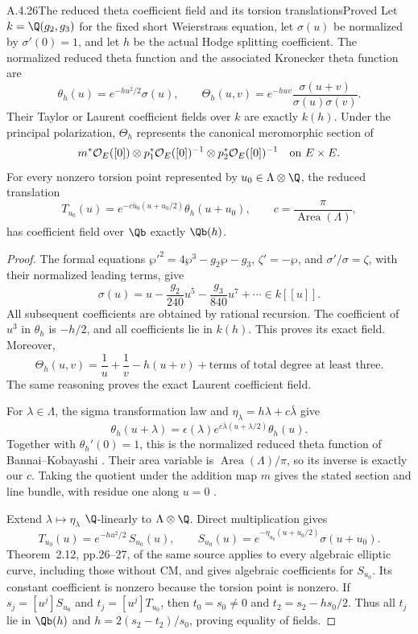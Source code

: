 \begin{result}{A.4.26}{The reduced theta coefficient field and its torsion translations}{Proved}
Let $k=\Q(g_2,g_3)$ for the fixed short Weierstrass equation, let $\sigma(u)$ be normalized by $\sigma'(0)=1$, and let $h$ be the actual Hodge splitting coefficient. The normalized reduced theta function and the associated Kronecker theta function are
\[
 \theta_h(u)=e^{-hu^2/2}\sigma(u),\qquad
 \Theta_h(u,v)=e^{-huv}\frac{\sigma(u+v)}{\sigma(u)\sigma(v)}.
\]
Their Taylor or Laurent coefficient fields over $k$ are exactly $k(h)$. Under the principal polarization, $\Theta_h$ represents the canonical meromorphic section of
\[
 m^*\mathcal O_E([0])\otimes
 p_1^*\mathcal O_E([0])^{-1}\otimes
 p_2^*\mathcal O_E([0])^{-1}
 \quad\hbox{on }E\times E.
\]
For every nonzero torsion point represented by $u_0\in\Lambda\otimes\Q$, the reduced translation
\[
 T_{u_0}(u)=
 e^{-c\bar u_0(u+u_0/2)}\theta_h(u+u_0),
 \qquad c=\frac{\pi}{\operatorname{Area}(\Lambda)},
\]
has coefficient field over $\Qb$ exactly $\Qb(h)$.
\end{result}
\begin{proof}
The formal equations $\wp'^2=4\wp^3-g_2\wp-g_3$, $\zeta'=-\wp$, and $\sigma'/\sigma=\zeta$, with their normalized leading terms, give
\[
 \sigma(u)=u-\frac{g_2}{240}u^5-\frac{g_3}{840}u^7+\cdots\in k[[u]].
\]
All subsequent coefficients are obtained by rational recursion. The coefficient of $u^3$ in $\theta_h$ is $-h/2$, and all coefficients lie in $k(h)$. This proves its exact field. Moreover,
\[
 \Theta_h(u,v)=\frac1u+\frac1v-h(u+v)
       +\text{terms of total degree at least three}.
\]
The same reasoning proves the exact Laurent coefficient field.

For $\lambda\in\Lambda$, the sigma transformation law and
$\eta_\lambda=h\lambda+c\bar\lambda$ give
\[
 \theta_h(u+\lambda)
 =\epsilon(\lambda)
   e^{c\bar\lambda(u+\lambda/2)}\theta_h(u).
\]
Together with $\theta_h'(0)=1$, this is the normalized reduced theta function of Bannai--Kobayashi \cite[Example 1.9, pp.10--11]{EllBannaiKobayashi2010}. Their area variable is $\operatorname{Area}(\Lambda)/\pi$, so its inverse is exactly our $c$. Taking the quotient under the addition map $m$ gives the stated section and line bundle, with residue one along $u=0$ \cite[Example 1.10, pp.11--12]{EllBannaiKobayashi2010}.

Extend $\lambda\mapsto\eta_\lambda$ $\Q$-linearly to $\Lambda\otimes\Q$. Direct multiplication gives
\[
 T_{u_0}(u)=e^{-hu^2/2}\,S_{u_0}(u),\qquad
 S_{u_0}(u)=e^{-\eta_{u_0}(u+u_0/2)}\sigma(u+u_0).
\]
Theorem~2.12, pp.26--27, of the same source applies to every algebraic elliptic curve, including those without CM, and gives algebraic coefficients for $S_{u_0}$. Its constant coefficient is nonzero because the torsion point is nonzero. If $s_j=[u^j]S_{u_0}$ and $t_j=[u^j]T_{u_0}$, then
$t_0=s_0\ne0$ and $t_2=s_2-hs_0/2$. Thus all $t_j$ lie in $\Qb(h)$ and $h=2(s_2-t_2)/s_0$, proving equality of fields.
\end{proof}

